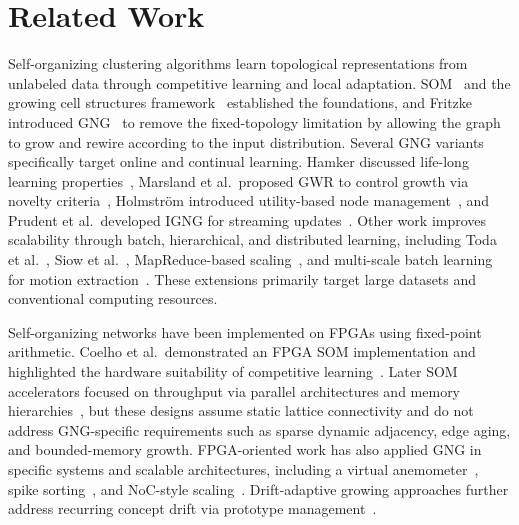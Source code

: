 \documentclass[conference]{IEEEtran}
\begin{document}
\section{Related Work}
Self-organizing clustering algorithms learn topological representations from unlabeled data through competitive learning and local adaptation. SOM~\cite{kohonen1982self,Kohonen1995SOM} and the growing cell structures framework~\cite{Fritzke1994GCS} established the foundations, and Fritzke introduced GNG~\cite{fritzke1994growing} to remove the fixed-topology limitation by allowing the graph to grow and rewire according to the input distribution. Several GNG variants specifically target online and continual learning. Hamker discussed life-long learning properties~\cite{hamker2001life}, Marsland et al.\ proposed GWR to control growth via novelty criteria~\cite{marsland2002self}, Holmstr\"om introduced utility-based node management~\cite{Holmstrom2002Utility}, and Prudent et al.\ developed IGNG for streaming updates~\cite{prudent2005incremental}. Other work improves scalability through batch, hierarchical, and distributed learning, including Toda et al.~\cite{toda2006multiple,toda2007batch,Toda2008MultiLayer}, Siow et al.~\cite{Siow2024DBL}, MapReduce-based scaling~\cite{ventocilla2021mapreduce}, and multi-scale batch learning for motion extraction~\cite{ardilla2023msblgng}. These extensions primarily target large datasets and conventional computing resources.

Self-organizing networks have been implemented on FPGAs using fixed-point arithmetic. Coelho et al.\ demonstrated an FPGA SOM implementation and highlighted the hardware suitability of competitive learning~\cite{coelho2020fpga}. Later SOM accelerators focused on throughput via parallel architectures and memory hierarchies~\cite{Dias2021SOMFPGA,deSousa2020SOMProcessor,yamagiwa2024scalable,hikawa2023nested}, but these designs assume static lattice connectivity and do not address GNG-specific requirements such as sparse dynamic adjacency, edge aging, and bounded-memory growth. FPGA-oriented work has also applied GNG in specific systems and scalable architectures, including a virtual anemometer~\cite{LaTona2020VirtualAnemometer}, spike sorting~\cite{Shoaran2015SpikeSorting}, and NoC-style scaling~\cite{Derue2025SWAPGNG}. Drift-adaptive growing approaches further address recurring concept drift via prototype management~\cite{Arostegi2025AiGAS}.
\end{document}
